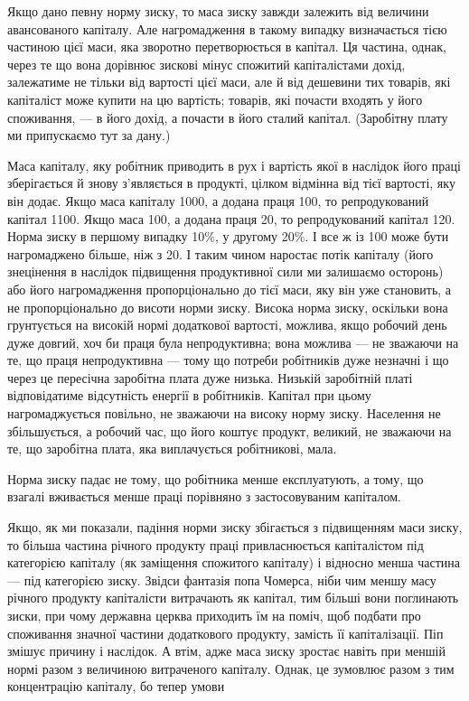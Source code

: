 
Якщо дано певну норму зиску, то маса зиску завжди залежить
від величини авансованого капіталу. Але нагромадження
в такому випадку визначається тією частиною цієї маси, яка
зворотно перетворюється в капітал. Ця частина, однак, через
те що вона дорівнює зискові мінус спожитий капіталістами дохід,
залежатиме не тільки від вартості цієї маси, але й від дешевини
тих товарів, які капіталіст може купити на цю вартість;
товарів, які почасти входять у його споживання, — в його дохід,
а почасти в його сталий капітал. (Заробітну плату ми припускаємо
тут за дану.)

Маса капіталу, яку робітник приводить в рух і вартість якої
в наслідок його праці зберігається й знову з’являється в продукті,
цілком відмінна від тієї вартості, яку він додає. Якщо
маса капіталу \deq{} 1000, а додана праця \deq{} 100, то репродукований
капітал \deq{} 1100. Якщо маса \deq{} 100, а додана праця \deq{} 20, то
репродукований капітал \deq{} 120. Норма зиску в першому випадку
\deq{} 10\%, у другому \deq{} 20\%. І все ж із 100 може бути
нагромаджено більше, ніж з 20. І таким чином наростає потік
капіталу (його знецінення в наслідок підвищення продуктивної
сили ми залишаємо осторонь) або його нагромадження
пропорціонально до тієї маси, яку він уже становить, а не
пропорціонально до висоти норми зиску. Висока норма зиску,
оскільки вона грунтується на високій нормі додаткової вартості,
можлива, якщо робочий день дуже довгий, хоч би
праця була непродуктивна; вона можлива — не зважаючи на
те, що праця непродуктивна — тому що потреби робітників
дуже незначні і що через це пересічна заробітна плата дуже
низька. Низькій заробітній платі відповідатиме відсутність енергії
в робітників. Капітал при цьому нагромаджується повільно,
не зважаючи на високу норму зиску. Населення не збільшується,
а робочий час, що його коштує продукт, великий, не зважаючи
на те, що заробітна плата, яка виплачується робітникові,
мала.

Норма зиску падає не тому, що робітника менше експлуатують,
а тому, що взагалі вживається менше праці порівняно
з застосовуваним капіталом.

Якщо, як ми показали, падіння норми зиску збігається з підвищенням
маси зиску, то більша частина річного продукту праці
привласнюється капіталістом під категорією капіталу (як заміщення
спожитого капіталу) і відносно менша частина — під категорією
зиску. Звідси фантазія попа Чомерса, ніби чим меншу масу річного
продукту капіталісти витрачають як капітал, тим більші
вони поглинають зиски, при чому державна церква приходить
їм на поміч, щоб подбати про споживання значної частини додаткового
продукту, замість її капіталізації. Піп змішує причину
і наслідок. А втім, адже маса зиску зростає навіть при меншій
нормі разом з величиною витраченого капіталу. Однак, це зумовлює
разом з тим концентрацію капіталу, бо тепер умови
\parbreak{}  %
